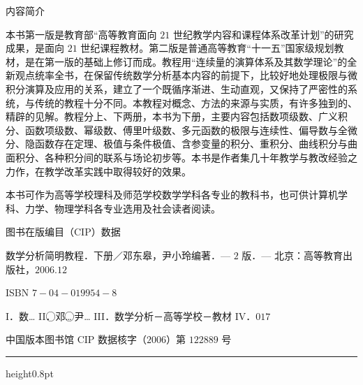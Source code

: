 
\begingroup
\pagestyle{empty}

{\headfont{} 内容简介\par}
\vspace{0.5em}

本书第一版是教育部``高等教育面向 $21$ 世纪教学内容和课程体系改革计划''的研究成果，是面向 $21$ 世纪课程教材。第二版是普通高等教育``十一五''国家级规划教材，是在第一版的基础上修订而成。教程用``连续量的演算体系及其数学理论''的全新观点统率全书，在保留传统数学分析基本内容的前提下，比较好地处理极限与微积分演算及应用的关系，建立了一个既循序渐进、生动直观，又保持了严密性的系统，与传统的教程十分不同。本教程对概念、方法的来源与实质，有许多独到的、精辟的见解。教程分上、下两册，本书为下册，主要内容包括数项级数、广义积分、函数项级数、幂级数、傅里叶级数、多元函数的极限与连续性、偏导数与全微分、隐函数存在定理、极值与条件极值、含参变量的积分、重积分、曲线积分与曲面积分、各种积分间的联系与场论初步等。本书是作者集几十年教学与教改经验之力作，在教学改革实践中取得较好的效果。

本书可作为高等学校理科及师范学校数学学科各专业的教科书，也可供计算机学科、力学、物理学科各专业选用及社会读者阅读。

\vspace{1em}
{\headfont{} 图书在版编目（CIP）数据\par}
\vspace{0.3em}

数学分析简明教程．下册／邓东皋，尹小玲编著．— $2$ 版．— 北京：高等教育出版社，$2006.12$

ISBN $7-04-019954-8$

{\rmfamily I}．数… {\rmfamily II}．\textcircled{}邓… \textcircled{}尹… {\rmfamily III}．数学分析－高等学校－教材 {\rmfamily IV}．$017$

中国版本图书馆 CIP 数据核字（$2006$）第 $122889$ 号

\vspace{1em}
{\color{black}\hrule height0.8pt}
\vspace{0.8em}

